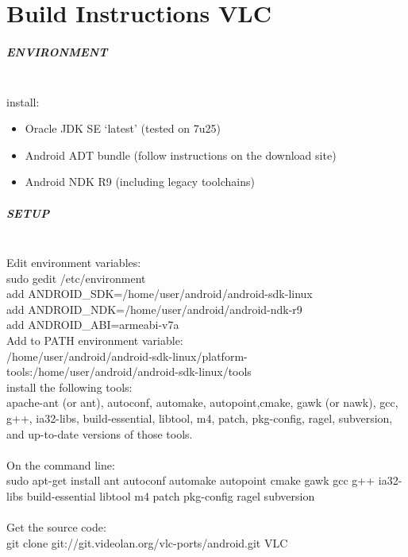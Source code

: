 \chapter{Build Instructions VLC}
\label{sec:app_vlc_build}
\paragraph{ENVIRONMENT} \mbox{}\\
install:
\begin{itemize}
\item Oracle JDK SE `latest' (tested on 7u25)
\item Android ADT bundle (follow instructions on the download site)
\item Android NDK R9 (including legacy toolchains)
\end{itemize}

\paragraph{SETUP}\mbox{}\\
Edit environment variables:
\\
sudo gedit /etc/environment\\
add ANDROID\_SDK=/home/user/android/android-sdk-linux\\
add ANDROID\_NDK=/home/user/android/android-ndk-r9\\
add ANDROID\_ABI=armeabi-v7a\\

Add to PATH environment variable:\\
/home/user/android/android-sdk-linux/platform-tools:/home/user/android/android-sdk-linux/tools\\
install the following tools: \\
apache-ant (or ant), autoconf, automake, autopoint,cmake, gawk (or nawk), gcc, g++, ia32-libs, build-essential, libtool, m4, patch, pkg-config, ragel, subversion, and up-to-date versions of those tools.\\
\\
On the command line:\\
sudo apt-get install ant autoconf automake autopoint cmake gawk gcc g++ ia32-libs build-essential libtool m4 patch pkg-config ragel subversion\\
\\
Get the source code:\\
git clone git://git.videolan.org/vlc-ports/android.git VLC\\


